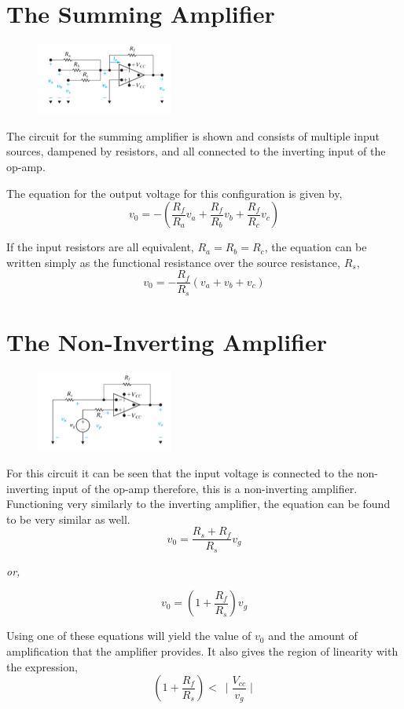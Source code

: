 \documentclass[12pt]{article}
\begin{document}
    \section*{The Summing Amplifier}
    \begin{figure}[h]
        \centering
        \includegraphics[width=0.4\textwidth]{Summing Amplifier.png}
    \end{figure}
    \par The circuit for the summing amplifier is shown and consists of multiple
    input sources, dampened by resistors, and all connected to the inverting
    input of the op-amp.
    \par The equation for the output voltage for this configuration is given by,
    \[
        v_0 = -\left( \frac{R_f}{R_a}v_a + \frac{R_f}{R_b}v_b +
        \frac{R_f}{R_c}v_c \right)
    \]
    \par If the input resistors are all equivalent, $R_a = R_b = R_c$, the
    equation can be written simply as the functional resistance over the source
    resistance, $R_s$,
    \[
        v_0 = -\frac{R_f}{R_s}(v_a + v_b + v_c)
    \]
    \section*{The Non-Inverting Amplifier}
    \begin{figure}[h]
        \centering
        \includegraphics[width=0.4\textwidth]{Non-Inverting Amplifier.png}
    \end{figure}
    \par For this circuit it can be seen that the input voltage is connected to
    the non-inverting input of the op-amp therefore, this is a non-inverting
    amplifier. Functioning very similarly to the inverting amplifier, the
    equation can be found to be very similar as well.
    \[
        v_0 = \frac{R_s + R_f}{R_s}v_g
    \]
    \begin{center}
        \textit{or,}
    \end{center}
    \[
        v_0 = \left( 1 + \frac{R_f}{R_s} \right)v_g
    \]
    \par Using one of these equations will yield the value of $v_0$ and the
    amount of amplification that the amplifier provides. It also gives the
    region of linearity with the expression,
    \[
        \left( 1 + \frac{R_f}{R_s} \right) <\ \mid \frac{V_{cc}}{v_g} \mid
    \]
\end{document}
